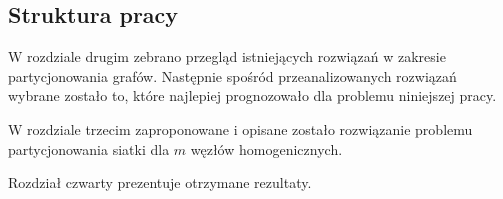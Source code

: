 \subsection{Struktura pracy}

W rozdziale drugim zebrano przegląd istniejących rozwiązań w zakresie partycjonowania grafów.
Następnie spośród przeanalizowanych rozwiązań wybrane zostało to, które najlepiej prognozowało dla
problemu niniejszej pracy.

W rozdziale trzecim zaproponowane i opisane zostało rozwiązanie problemu partycjonowania siatki dla
$m$ węzłów homogenicznych.

Rozdział czwarty prezentuje otrzymane rezultaty.